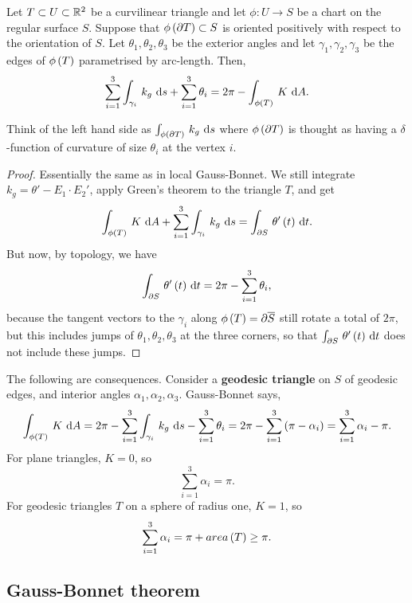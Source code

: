 \begin{theorem}
Let $ T \subset U \subset \mathbb{R}^2 $ be a curvilinear triangle and let $ \phi : U \to S $ be a chart on the regular surface $ S $. Suppose that $ \phi\br{\partial T} \subset S $ is oriented positively with respect to the orientation of $ S $. Let $ \theta_1, \theta_2, \theta_3 $ be the exterior angles and let $ \gamma_1, \gamma_2, \gamma_3 $ be the edges of $ \phi\br{T} $ parametrised by arc-length. Then,
$$ \sum_{i = 1}^3 \intd{\gamma_i}{}{k_g}{s} + \sum_{i = 1}^3 \theta_i = 2\pi - \intd{\phi\br{T}}{}{K}{A}. $$
\end{theorem}

Think of the left hand side as $ \intd{\phi\br{\partial T}}{}{k_g}{s} $ where $ \phi\br{\partial T} $ is thought as having a $ \delta $-function of curvature of size $ \theta_i $ at the vertex $ i $.

\begin{proof}
Essentially the same as in local Gauss-Bonnet. We still integrate $ k_g = \theta' - E_1 \cdot E_2' $, apply Green's theorem to the triangle $ T $, and get
$$ \intd{\phi\br{T}}{}{K}{A} + \sum_{i = 1}^3 \intd{\gamma_i}{}{k_g}{s} = \intd{\partial S}{}{\theta'\br{t}}{t}. $$
But now, by topology, we have
$$ \intd{\partial S}{}{\theta'\br{t}}{t} = 2\pi - \sum_{i = 1}^3 \theta_i, $$
because the tangent vectors to the $ \gamma_i $ along $ \phi\br{T} = \partial\overline{S} $ still rotate a total of $ 2\pi $, but this includes jumps of $ \theta_1, \theta_2, \theta_3 $ at the three corners, so that $ \intd{\partial S}{}{\theta'\br{t}}{t} $ does not include these jumps.
\end{proof}

The following are consequences. Consider a \textbf{geodesic triangle} on $ S $ of geodesic edges, and interior angles $ \alpha_1, \alpha_2, \alpha_3 $. Gauss-Bonnet says,
$$ \intd{\phi\br{T}}{}{K}{A} = 2\pi - \sum_{i = 1}^3 \intd{\gamma_i}{}{k_g}{s} - \sum_{i = 1}^3 \theta_i = 2\pi - \sum_{i = 1}^3 \br{\pi - \alpha_i} = \sum_{i = 1}^3 \alpha_i - \pi. $$
For plane triangles, $ K = 0 $, so
$$ \sum_{i = 1}^3 \alpha_i = \pi. $$
For geodesic triangles $ T $ on a sphere of radius one, $ K = 1 $, so
$$ \sum_{i = 1}^3 \alpha_i = \pi + area\br{T} \ge \pi. $$

\pagebreak

\subsection{Gauss-Bonnet theorem}

